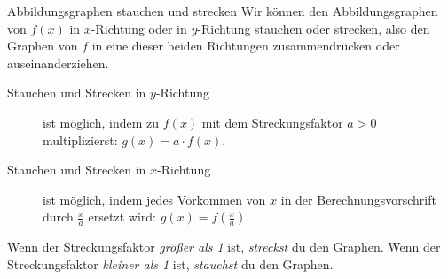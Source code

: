 \documentclass[../../main.tex]{subfiles}
\begin{document}
\begin{nutshell}{Abbildungsgraphen stauchen und strecken}
    Wir können den Abbildungsgraphen von $f(x)$ in $x$-Richtung oder in $y$-Richtung stauchen oder strecken, also den Graphen von $f$ in eine dieser beiden Richtungen zusammendrücken oder auseinanderziehen.
    \begin{description}
        \item[Stauchen und Strecken in $y$-Richtung] ist möglich, indem zu $f(x)$ mit dem Streckungsfaktor $a>0$ multiplizierst: $g(x) = a\cdot f(x)$.
        \item[Stauchen und Strecken in $x$-Richtung] ist möglich, indem jedes Vorkommen von $x$ in der Berechnungsvorschrift durch $\frac{x}{a}$ ersetzt wird: $g(x)=f(\frac{x}{a})$.
    \end{description}
     Wenn der Streckungsfaktor \emph{größer als 1} ist, \emph{streckst} du den Graphen. Wenn der Streckungsfaktor \emph{kleiner als 1} ist, \emph{stauchst} du den Graphen.
\end{nutshell}
\end{document}
